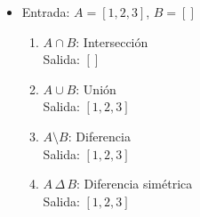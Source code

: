 \begin{enumerate}
\begin{itemize}
        \item Entrada: \( A = [1, 2, 3] \), \( B = [] \)
        \begin{enumerate}
            \item \( A \cap B \): Intersección\\
            Salida: \([]\)
    
            \item \( A \cup B \): Unión\\
            Salida: \([1, 2, 3]\)
    
            \item \( A \setminus B \): Diferencia\\
            Salida: \([1, 2, 3]\)
    
            \item \( A \, \Delta \, B \): Diferencia simétrica\\
            Salida: \([1, 2, 3]\)
        \end{enumerate}
    \end{itemize}
\end{enumerate}